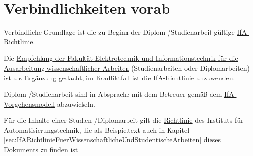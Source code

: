 
\chapter{Verbindlichkeiten vorab}
\label{sec:VerbindlichkeitenVorab}

\begin{compactitem}
  \item Verbindliche Grundlage ist die zu Beginn der Diplom-/Studienarbeit gültige \href{http://www.et.tu-dresden.de/ifa/index.php?id=330}{IfA-Richtlinie}.
  \item Die \href{http://www.et.tu-dresden.de/etit/uploads/media/EmpfehlungWissenschArbeiten2013_05.pdf}{Empfehlung der Fakultät Elektrotechnik und Informationstechnik für die Ausarbeitung wissenschaftlicher Arbeiten} (Studienarbeiten oder Diplomarbeiten) ist als Ergänzung gedacht, im Konfliktfall ist die IfA-Richtlinie anzuwenden.
  \item Diplom-/Studienarbeit sind in Absprache mit dem Betreuer gemäß dem \href{http://www.et.tu-dresden.de/ifa/index.php?id=331&L=1?keepThis=true}{IfA-Vorgehensmodell} abzuwickeln.
  \item Für die Inhalte einer Studien-/Diplomarbeit gilt die \href{http://www.et.tu-dresden.de/ifa/index.php?id=336&L=1?keepThis=true}{Richtlinie} des Instituts für Automatisierungstechnik, die als Beispieltext auch in Kapitel \ref{sec:IfARichtlinieFuerWissenschaftlicheUndStudentischeArbeiten} dieses Dokuments zu finden ist
\end{compactitem}